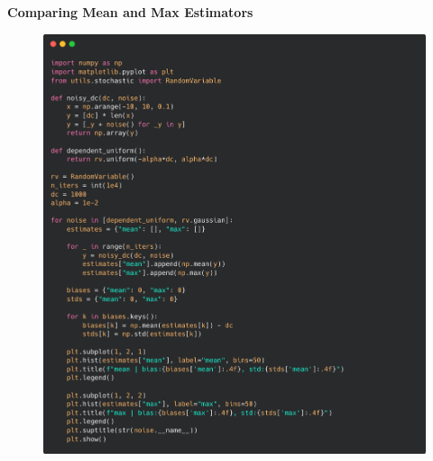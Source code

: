 \documentclass[12pt]{article}
\begin{document}
\textbf{Comparing Mean and Max Estimators}
\begin{figure}[H] 
\centering \includegraphics[scale=0.2]{code-ce.png}  
\end{figure}
\end{document}
